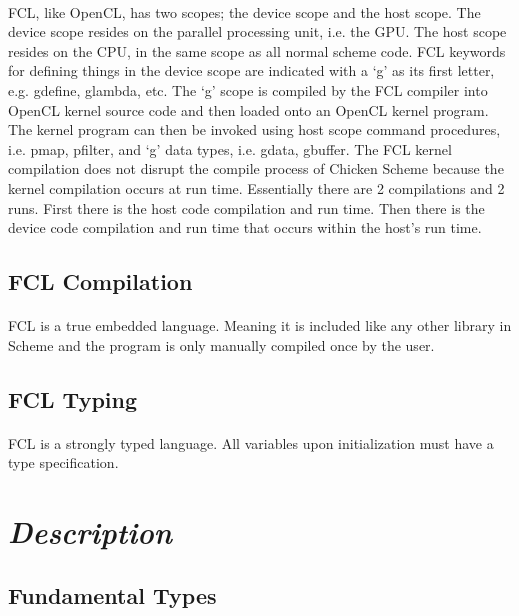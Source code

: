 \documentclass{article}
\begin{document}
\paragraph{}
FCL, like OpenCL, has two scopes; the device scope and the host scope.
The device scope resides on the parallel processing unit, i.e. the GPU.
The host scope resides on the CPU, in the same scope as all normal scheme code.
FCL keywords for defining things in the device scope are indicated with a
`g' as its first letter, e.g. gdefine, glambda, etc. The `g' scope is
compiled by the FCL compiler into OpenCL kernel source code and then loaded
onto an OpenCL kernel program.  The kernel program can then be invoked using
host scope command procedures, i.e. pmap, pfilter, and `g' data types, i.e.
gdata, gbuffer. The FCL kernel compilation does not disrupt the compile process of
Chicken Scheme because the kernel compilation occurs at run time. Essentially
there are 2 compilations and 2 runs. First there is the host code compilation and run
time. Then there is the device code compilation and run time that occurs within
the host's run time.

\subsection{FCL Compilation}
\paragraph{}
FCL is a true embedded language. Meaning it is included like any other library
in Scheme and the program is only manually compiled once by the user.

\subsection{FCL Typing}
\paragraph{}
FCL is a strongly typed language. All variables upon initialization must have a
type specification.

\section{\emph{Description}}
\subsection{Fundamental Types}
\end{document}
